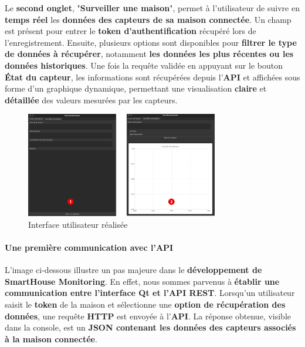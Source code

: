 \documentclass[10pt, a4paper]{report}
\begin{document}
	Le \textbf{second onglet}, "\textbf{Surveiller une maison}", permet à l’utilisateur de suivre en \textbf{temps réel} les \textbf{données des capteurs de sa maison connectée}. Un champ est présent pour entrer le \textbf{token d’authentification} récupéré lors de l'enregistrement. Ensuite, plusieurs options sont disponibles pour \textbf{filtrer le type de données à récupérer}, notamment \textbf{les données les plus récentes ou les données historiques}. Une fois la requête validée en appuyant sur le bouton \textbf{État du capteur}, les informations sont récupérées depuis l’\textbf{API} et affichées sous forme d’un graphique dynamique, permettant une visualisation \textbf{claire} et \textbf{détaillée} des valeurs mesurées par les capteurs.
	\begin{figure}[h!]
		\centering
		\includegraphics[width=0.75\textwidth]{ressources/img/preuves/qt12.drawio}
		\caption{Interface utilisateur réalisée}
		\label{fig:interfaceQT}
	\end{figure}
	
	\paragraph{Une première communication avec l'API\\} 
	L’image ci-dessous illustre un pas majeure dans le \textbf{développement de SmartHouse Monitoring}. En effet, nous sommes parvenus à \textbf{établir une communication entre l’interface Qt et l’API REST}. Lorsqu’un utilisateur saisit le \textbf{token} de la maison et sélectionne une \textbf{option de récupération des données}, une requête \textbf{HTTP} est envoyée à l’\textbf{API}. La réponse obtenue, visible dans la console, est un \textbf{JSON contenant les données des capteurs associés à la maison connectée}.\\
	
\end{document}
